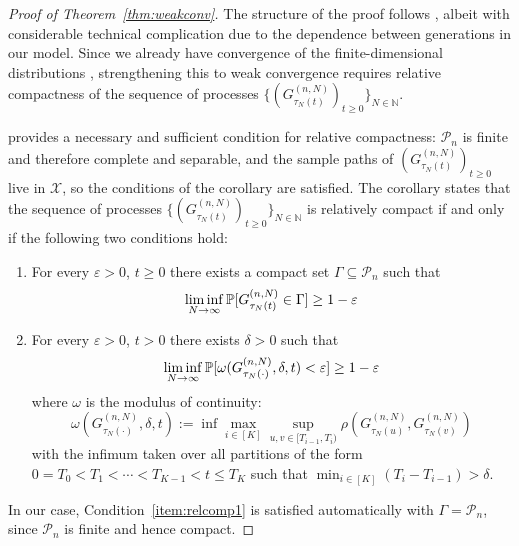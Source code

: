 \begin{proof}[Proof of Theorem~\ref{thm:weakconv}]
The structure of the proof follows \textcite{mohle1999}, albeit with considerable technical complication due to the dependence between generations in our model. 
Since we already have convergence of the finite-dimensional distributions \parencite[Theorem 1]{brown2021}, strengthening this to weak convergence requires relative compactness of the sequence of processes $\{ (G_{\tau_N(t)}^{(n,N)})_{t\geq0} \}_{N\in\mathbb{N}}$.

\textcite[Chapter 3, Corollary 7.4]{ethier1986} provides a necessary and sufficient condition for relative compactness: $\mathcal{P}_n$ is finite and therefore complete and separable, and the sample paths of $(G_{\tau_N(t)}^{(n,N)})_{t\geq0}$ live in $\mathcal{X}$, so the conditions of the corollary are satisfied.
The corollary states that the sequence of processes $\{ (G_{\tau_N(t)}^{(n,N)})_{t\geq0} \}_{N\in\mathbb{N}}$ is relatively compact if and only if the following two conditions hold:
\begin{enumerate}
\item \label{item:relcomp1} For every $\varepsilon>0$, $t\geq 0$ there exists a compact set $\Gamma \subseteq \mathcal{P}_n$ such that
\begin{equation*}
\liminf_{N\to\infty} \mathbb{P}[ G_{\tau_N(t)}^{(n,N)} \in \Gamma ] 
\geq 1-\varepsilon
\end{equation*}
\item \label{item:relcomp2} For every $\varepsilon>0$, $t>0$ there exists $\delta>0$ such that
\begin{equation*}
\liminf_{N\to\infty} \mathbb{P}[ \omega(G_{\tau_N(\cdot)}^{(n,N)}, \delta, t) < \varepsilon ] 
\geq 1-\varepsilon
\end{equation*}
where $\omega$ is the modulus of continuity:
\begin{equation*}
\omega(G_{\tau_N(\cdot)}^{(n,N)}, \delta, t) := \inf \max_{i \in [K]} 
        \sup_{u,v \in [T_{i-1}, T_i)} \rho\left( 
        G_{\tau_N(u)}^{(n,N)}, G_{\tau_N(v)}^{(n,N)} \right)
\end{equation*}
with the infimum taken over all partitions of the form $0=T_0<T_1<\cdots <T_{K-1} <t \leq T_K$ such that $\min_{i\in[K]} (T_i - T_{i-1}) > \delta$. 
\end{enumerate}
In our case, Condition~\ref{item:relcomp1} is satisfied automatically with $\Gamma = \mathcal{P}_n$, since $\mathcal{P}_n$ is finite and hence compact. 

\end{proof}
